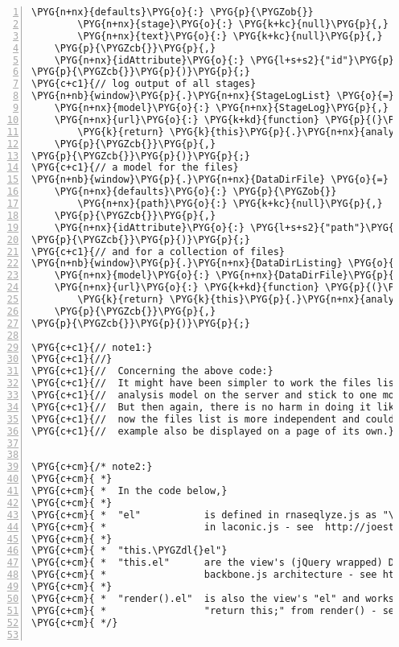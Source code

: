 \begin{Verbatim}[commandchars=\\\{\},numbers=left,firstnumber=1,stepnumber=5]
    \PYG{n+nx}{defaults}\PYG{o}{:} \PYG{p}{\PYGZob{}}
        \PYG{n+nx}{stage}\PYG{o}{:} \PYG{k+kc}{null}\PYG{p}{,}
        \PYG{n+nx}{text}\PYG{o}{:} \PYG{k+kc}{null}\PYG{p}{,}
    \PYG{p}{\PYGZcb{}}\PYG{p}{,}
    \PYG{n+nx}{idAttribute}\PYG{o}{:} \PYG{l+s+s2}{"id"}\PYG{p}{,}
\PYG{p}{\PYGZcb{}}\PYG{p}{)}\PYG{p}{;}
\PYG{c+c1}{// log output of all stages}
\PYG{n+nb}{window}\PYG{p}{.}\PYG{n+nx}{StageLogList} \PYG{o}{=} \PYG{n+nx}{Backbone}\PYG{p}{.}\PYG{n+nx}{Collection}\PYG{p}{.}\PYG{n+nx}{extend}\PYG{p}{(}\PYG{p}{\PYGZob{}}
    \PYG{n+nx}{model}\PYG{o}{:} \PYG{n+nx}{StageLog}\PYG{p}{,}
    \PYG{n+nx}{url}\PYG{o}{:} \PYG{k+kd}{function} \PYG{p}{(}\PYG{p}{)} \PYG{p}{\PYGZob{}}
        \PYG{k}{return} \PYG{k}{this}\PYG{p}{.}\PYG{n+nx}{analysis}\PYG{p}{.}\PYG{n+nx}{url}\PYG{p}{(}\PYG{p}{)} \PYG{o}{+} \PYG{l+s+s2}{"/logs"}\PYG{p}{;}
    \PYG{p}{\PYGZcb{}}\PYG{p}{,}
\PYG{p}{\PYGZcb{}}\PYG{p}{)}\PYG{p}{;}
\PYG{c+c1}{// a model for the files}
\PYG{n+nb}{window}\PYG{p}{.}\PYG{n+nx}{DataDirFile} \PYG{o}{=} \PYG{n+nx}{Backbone}\PYG{p}{.}\PYG{n+nx}{Model}\PYG{p}{.}\PYG{n+nx}{extend}\PYG{p}{(}\PYG{p}{\PYGZob{}}
    \PYG{n+nx}{defaults}\PYG{o}{:} \PYG{p}{\PYGZob{}}
        \PYG{n+nx}{path}\PYG{o}{:} \PYG{k+kc}{null}\PYG{p}{,}
    \PYG{p}{\PYGZcb{}}\PYG{p}{,}
    \PYG{n+nx}{idAttribute}\PYG{o}{:} \PYG{l+s+s2}{"path"}\PYG{p}{,}
\PYG{p}{\PYGZcb{}}\PYG{p}{)}\PYG{p}{;}
\PYG{c+c1}{// and for a collection of files}
\PYG{n+nb}{window}\PYG{p}{.}\PYG{n+nx}{DataDirListing} \PYG{o}{=} \PYG{n+nx}{Backbone}\PYG{p}{.}\PYG{n+nx}{Collection}\PYG{p}{.}\PYG{n+nx}{extend}\PYG{p}{(}\PYG{p}{\PYGZob{}}
    \PYG{n+nx}{model}\PYG{o}{:} \PYG{n+nx}{DataDirFile}\PYG{p}{,}
    \PYG{n+nx}{url}\PYG{o}{:} \PYG{k+kd}{function} \PYG{p}{(}\PYG{p}{)} \PYG{p}{\PYGZob{}}
        \PYG{k}{return} \PYG{k}{this}\PYG{p}{.}\PYG{n+nx}{analysis}\PYG{p}{.}\PYG{n+nx}{url}\PYG{p}{(}\PYG{p}{)} \PYG{o}{+} \PYG{l+s+s2}{"/files"}\PYG{p}{;}
    \PYG{p}{\PYGZcb{}}\PYG{p}{,}
\PYG{p}{\PYGZcb{}}\PYG{p}{)}\PYG{p}{;}

\PYG{c+c1}{// note1:}
\PYG{c+c1}{//}
\PYG{c+c1}{//  Concerning the above code:}
\PYG{c+c1}{//  It might have been simpler to work the files list right into the}
\PYG{c+c1}{//  analysis model on the server and stick to one model here.}
\PYG{c+c1}{//  But then again, there is no harm in doing it like this, because}
\PYG{c+c1}{//  now the files list is more independent and could for}
\PYG{c+c1}{//  example also be displayed on a page of its own.}


\PYG{c+cm}{/* note2:}
\PYG{c+cm}{ *}
\PYG{c+cm}{ *  In the code below,}
\PYG{c+cm}{ *}
\PYG{c+cm}{ *  "el"           is defined in rnaseqlyze.js as "\PYGZdl{}.el", which is defined}
\PYG{c+cm}{ *                 in laconic.js - see  http://joestelmach.github.com/laconic/}
\PYG{c+cm}{ *}
\PYG{c+cm}{ *  "this.\PYGZdl{}el"}
\PYG{c+cm}{ *  "this.el"      are the view's (jQuery wrapped) DOM element in the}
\PYG{c+cm}{ *                 backbone.js architecture - see http://backbonejs.org/\PYGZsh{}View-el}
\PYG{c+cm}{ *}
\PYG{c+cm}{ *  "render().el"  is also the view's "el" and works because we always}
\PYG{c+cm}{ *                 "return this;" from render() - see http://backbonejs.org/\PYGZsh{}View-render}
\PYG{c+cm}{ */}


\end{Verbatim}
